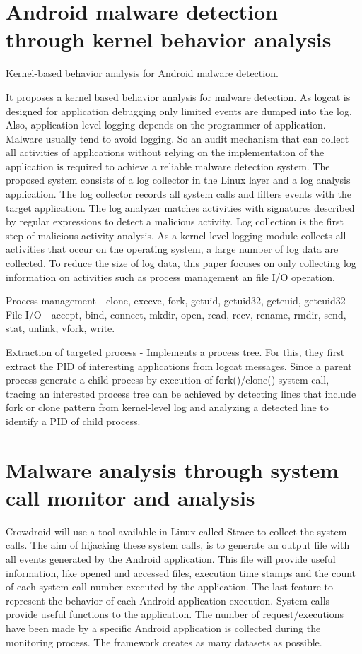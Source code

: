 \documentclass[12pt]{report}
\begin{document}
\section{Android malware detection through kernel behavior analysis}

Kernel-based behavior analysis for
Android malware detection.\citep{isohara2011kernel}

It proposes a kernel based behavior analysis for malware detection. As logcat is designed for application debugging only limited events are dumped into the log. Also, application level logging depends on the programmer of application. Malware usually tend to avoid logging. So an audit mechanism that can collect all activities of applications without relying on
the implementation of the application is required to achieve a reliable malware detection system. The proposed system consists of a log collector in the Linux layer and a log analysis
application. The log collector records all system calls and
filters events with the target application. The log analyzer
matches activities with signatures described by regular
expressions to detect a malicious activity. Log collection is the first step of malicious activity
analysis. As a kernel-level logging module
collects all activities that occur on the operating system, a large
number of log data are collected. To reduce the size of log data, this paper focuses on only collecting log information on activities such as process management an file I/O operation.

Process management -
clone, execve, fork, getuid, getuid32,
geteuid, geteuid32
File I/O - accept, bind, connect, mkdir, open,
read, recv, rename, rmdir, send, stat,
unlink, vfork, write. 

Extraction of targeted process - Implements a process tree. For this, they first extract the PID of interesting applications from logcat messages.
Since a parent process generate a child process by execution of
fork()/clone() system call, tracing an interested process tree
can be achieved by detecting lines that include fork or
clone pattern from kernel-level log and analyzing a detected line to identify a PID of child process.

\section{Malware analysis through system call monitor and analysis}

	Crowdroid\citep{burguera2011crowdroid} will use a tool available in Linux
	called Strace to collect the system calls. The aim of hijacking
	these system calls, is to generate an output file with all
	events generated by the Android application. This file will
	provide useful information, like opened and accessed files,
	execution time stamps and the count of each system call
	number executed by the application. The last
	feature to represent the behavior of each Android application
	execution. System calls provide useful functions to the application. The number of
    request/executions have been made by a specific Android
    application is collected during the monitoring process. The framework creates as many datasets as possible. 
    
\end{document}
